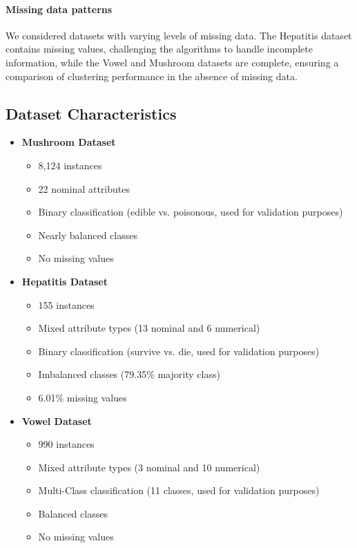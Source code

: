 \paragraph{Missing data patterns} 
We considered datasets with varying levels of missing data. The Hepatitis dataset contains missing values, challenging the algorithms to handle incomplete information, while the Vowel and Mushroom datasets are complete, ensuring a comparison of clustering performance in the absence of missing data.

\subsection{Dataset Characteristics}

\begin{itemize}
    \item \textbf{Mushroom Dataset}
    \begin{itemize}
        \item 8,124 instances
        \item 22 nominal attributes
        \item Binary classification (edible vs. poisonous, used for validation purposes)
        \item Nearly balanced classes
        \item No missing values
    \end{itemize}
    
    \item \textbf{Hepatitis Dataset}
    \begin{itemize}
        \item 155 instances
        \item Mixed attribute types (13 nominal and 6 numerical)
        \item Binary classification (survive vs. die, used for validation purposes)
        \item Imbalanced classes (79.35\% majority class)
        \item 6.01\% missing values
    \end{itemize}

    \item \textbf{Vowel Dataset}
    \begin{itemize}
        \item 990 instances
        \item Mixed attribute types (3 nominal and 10 numerical)
        \item Multi-Class classification (11 classes, used for validation purposes)
        \item Balanced classes
        \item No missing values
    \end{itemize}
\end{itemize}

